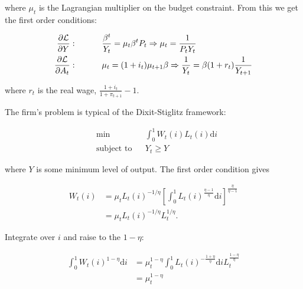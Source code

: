 \documentclass[12pt,a4paper]{scrartcl}            %
\begin{document}
where $\mu_t$ is the Lagrangian multiplier on the budget constraint.
From this we get the first order conditions:

\begin{equation}
\begin{aligned}
    \label{eqa:focs}
    \frac{\partial \Lagr}{\partial Y} & :   \ \ \ \ \ \ \ \ \  \frac{\beta^t}{Y_t} = \mu_t \beta^t P_t \Rightarrow \mu_t = \frac{1}{P_t Y_t} \\
    \frac{\partial \Lagr}{\partial A_t} & : \ \ \ \ \ \ \ \ \  \mu_t = (1 + i_t) \mu_{t + 1} \beta \Rightarrow \frac{1}{Y_t} = \beta (1 + r_t) \frac{1}{Y_{t+1}}
\end{aligned}
\end{equation}

where $r_t$ is the real wage, $\frac{1 + i_t}{1 + \pi_{t+1}} - 1$.

The firm's problem is typical of the Dixit-Stiglitz framework:

\begin{equation}
    \label{eqa:firms_problem}
    \begin{aligned}
        & \min
        & & \int_{0}^{1} \! W_t(i)L_t(i) \mathrm{d}i \\
        & \text{subject to}
        & & Y_t \geq Y
    \end{aligned}
\end{equation}

where $Y$ is some minimum level of output.  The first order condition gives

\begin{equation}
    \label{eqa:firms_foc}
    \begin{aligned}
        W_t(i) &= \mu_t L_t(i)^{-1 / \eta} \left[ \int_{0}^{1} \! L_t(i)^{\frac{\eta - 1}{\eta}} \mathrm{d}i \right]^{\frac{\eta}{\eta - 1}}\\
               &= \mu_t L_t(i)^{-1 / \eta} L_t^{1 / \eta}.
    \end{aligned}
\end{equation}

Integrate over $i$ and raise to the $1 - \eta$:

\begin{equation}
    \label{eqa:firms_foc2}
    \begin{aligned}
        \int_{0}^{1} \! W_t(i)^{1 - \eta} \mathrm{d}i &= \mu_t^{1 - \eta} \int_{0}^{1} \! L_t(i)^{-\frac{1 + \eta}{\eta}} \mathrm{d}i L_t^{\frac{1 - \eta}{\eta}}\\
                                                      &= \mu_t^{1 - \eta}
    \end{aligned}
\end{equation}
\end{document}
